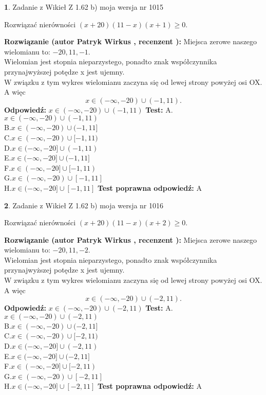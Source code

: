 \documentclass[12pt, a4paper]{article}
\theoremstyle{definition} %
\newtheorem{zad}{}
\newcommand{\zadStart}[1]{\begin{zad}#1\newline}
\newcommand{\zadStop}{\end{zad}}
\newcommand{\rozwStart}[2]{\noindent \textbf{Rozwiązanie (autor #1 , recenzent #2): }\newline}
\newcommand{\rozwStop}{\newline}
\newcommand{\odpStart}{\noindent \textbf{Odpowiedź:}\newline}
\newcommand{\odpStop}{\newline}
\newcommand{\testStart}{\noindent \textbf{Test:}\newline}
\newcommand{\testStop}{\newline}
\newcommand{\kluczStart}{\noindent \textbf{Test poprawna odpowiedź:}\newline}
\newcommand{\kluczStop}{\newline}
\begin{document}
\zadStart{Zadanie z Wikieł Z 1.62 b) moja wersja nr 1015}

Rozwiązać nierówności $(x+20)(11-x)(x+1)\ge0$.
\zadStop
\rozwStart{Patryk Wirkus}{}
Miejsca zerowe naszego wielomianu to: $-20, 11, -1$.\\
Wielomian jest stopnia nieparzystego, ponadto znak współczynnika przy\linebreak najwyższej potędze x jest ujemny.\\ W związku z tym wykres wielomianu zaczyna się od lewej strony powyżej osi OX. A więc $$x \in (-\infty,-20) \cup (-1,11).$$
\rozwStop
\odpStart
$x \in (-\infty,-20) \cup (-1,11)$
\odpStop
\testStart
A.$x \in (-\infty,-20) \cup (-1,11)$\\
B.$x \in (-\infty,-20) \cup (-1,11]$\\
C.$x \in (-\infty,-20) \cup [-1,11)$\\
D.$x \in (-\infty,-20] \cup (-1,11)$\\
E.$x \in (-\infty,-20] \cup (-1,11]$\\
F.$x \in (-\infty,-20] \cup [-1,11)$\\
G.$x \in (-\infty,-20) \cup [-1,11]$\\
H.$x \in (-\infty,-20] \cup [-1,11]$
\testStop
\kluczStart
A
\kluczStop



\zadStart{Zadanie z Wikieł Z 1.62 b) moja wersja nr 1016}

Rozwiązać nierówności $(x+20)(11-x)(x+2)\ge0$.
\zadStop
\rozwStart{Patryk Wirkus}{}
Miejsca zerowe naszego wielomianu to: $-20, 11, -2$.\\
Wielomian jest stopnia nieparzystego, ponadto znak współczynnika przy\linebreak najwyższej potędze x jest ujemny.\\ W związku z tym wykres wielomianu zaczyna się od lewej strony powyżej osi OX. A więc $$x \in (-\infty,-20) \cup (-2,11).$$
\rozwStop
\odpStart
$x \in (-\infty,-20) \cup (-2,11)$
\odpStop
\testStart
A.$x \in (-\infty,-20) \cup (-2,11)$\\
B.$x \in (-\infty,-20) \cup (-2,11]$\\
C.$x \in (-\infty,-20) \cup [-2,11)$\\
D.$x \in (-\infty,-20] \cup (-2,11)$\\
E.$x \in (-\infty,-20] \cup (-2,11]$\\
F.$x \in (-\infty,-20] \cup [-2,11)$\\
G.$x \in (-\infty,-20) \cup [-2,11]$\\
H.$x \in (-\infty,-20] \cup [-2,11]$
\testStop
\kluczStart
A
\kluczStop
\end{document}
